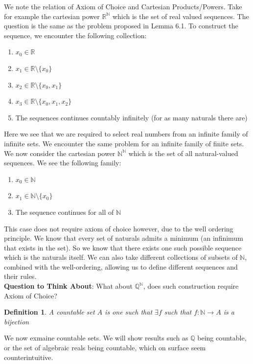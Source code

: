 \documentclass{article}
\newtheorem{defn}{Definition}[section]
\begin{document}
We note the relation of Axiom of Choice and Cartesian Products/Powers. Take for example the cartesian power $\mathbb{R}^\mathbb{N}$ which is the set of real valued sequences. The question is the same as the problem proposed in Lemma 6.1. To construct the sequence, we encounter the following collection:
\begin{enumerate}
    \item $x_0 \in \mathbb{R}$
    \item $x_1 \in \mathbb{R}\setminus \{x_0\}$
    \item $x_2 \in \mathbb{R}\setminus \{x_0, x_1\}$
    \item $x_3 \in \mathbb{R}\setminus \{x_0, x_1, x_2\}$
    \item The sequences continues countably infinitely (for as many naturals there are)
\end{enumerate}
Here we see that we are required to select real numbers from an infinite family of infinite sets. We encounter the same problem for an infinite family of finite sets.\\

We now consider the cartesian power $\mathbb{N}^\mathbb{N}$ which is the set of all natural-valued sequences. We see the following family:
\begin{enumerate}
    \item $x_0 \in \mathbb{N}$
    \item $x_1 \in \mathbb{N}\setminus \{x_0\}$
    \item The sequence continues for all of $\mathbb{N}$
\end{enumerate}
This case does not require axiom of choice however, due to the well ordering principle. We know that every set of naturals admits a minimum (an infinimum that exists in the set). So we know that there exists one such possible sequence which is the naturals itself. We can also take different collections of subsets of $\mathbb{N}$, combined with the well-ordering, allowing us to define different sequences and their rules.\\

\textbf{Question to Think About}: What about $\mathbb{Q}^\mathbb{N}$, does such construction require Axiom of Choice?\\

\medskip
\begin{defn}
A countable set $A$ is one such that $\exists f$ such that $f: \mathbb{N} \xrightarrow{} A$ is a bijection
\end{defn}
We now exmaine countable sets. We will show results such as $\mathbb{Q}$ being countable, or the set of algebraic reals being countable, which on surface seem counterintuitive.\\
\end{document}
